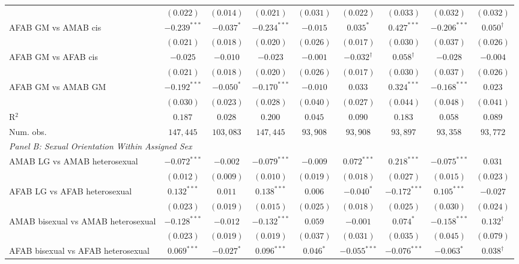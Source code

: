 \begin{table}[htpb!]
{\begin{tabular}{l c c c c c c c c}
 & $(0.022)$ & $(0.014)$ & $(0.021)$ & $(0.031)$ & $(0.022)$ & $(0.033)$ & $(0.032)$ & $(0.032)$ \\
AFAB GM vs AMAB cis & $-0.239^{***}$ & $-0.037^{*}$ & $-0.234^{***}$ & $-0.015$ & $0.035^{*}$ & $0.427^{***}$ & $-0.206^{***}$ & $0.050^{\dagger}$ \\
 & $(0.021)$ & $(0.018)$ & $(0.020)$ & $(0.026)$ & $(0.017)$ & $(0.030)$ & $(0.037)$ & $(0.026)$ \\
AFAB GM vs AFAB cis & $-0.025$ & $-0.010$ & $-0.023$ & $-0.001$ & $-0.032^{\dagger}$ & $0.058^{\dagger}$ & $-0.028$ & $-0.004$ \\
 & $(0.021)$ & $(0.018)$ & $(0.020)$ & $(0.026)$ & $(0.017)$ & $(0.030)$ & $(0.037)$ & $(0.026)$ \\
AFAB GM vs AMAB GM & $-0.192^{***}$ & $-0.050^{*}$ & $-0.170^{***}$ & $-0.010$ & $0.033$ & $0.324^{***}$ & $-0.168^{***}$ & $0.023$ \\
 & $(0.030)$ & $(0.023)$ & $(0.028)$ & $(0.040)$ & $(0.027)$ & $(0.044)$ & $(0.048)$ & $(0.041)$ \\
\hline
R$^2$ & $0.187$ & $0.028$ & $0.200$ & $0.045$ & $0.090$ & $0.183$ & $0.058$ & $0.089$ \\
Num. obs. & $147,445$ & $103,083$ & $147,445$ & $93,908$ & $93,908$ & $93,897$ & $93,358$ & $93,772$ \\
\hline
\multicolumn{9}{l}{\textit{Panel B: Sexual Orientation Within Assigned Sex}} \\
AMAB LG vs AMAB heterosexual & $-0.072^{***}$ & $-0.002$ & $-0.079^{***}$ & $-0.009$ & $0.072^{***}$ & $0.218^{***}$ & $-0.075^{***}$ & $0.031$ \\
 & $(0.012)$ & $(0.009)$ & $(0.010)$ & $(0.019)$ & $(0.018)$ & $(0.027)$ & $(0.015)$ & $(0.023)$ \\
AFAB LG vs AFAB heterosexual & $0.132^{***}$ & $0.011$ & $0.138^{***}$ & $0.006$ & $-0.040^{*}$ & $-0.172^{***}$ & $0.105^{***}$ & $-0.027$ \\
 & $(0.023)$ & $(0.019)$ & $(0.015)$ & $(0.025)$ & $(0.018)$ & $(0.025)$ & $(0.030)$ & $(0.024)$ \\
AMAB bisexual vs AMAB heterosexual & $-0.128^{***}$ & $-0.012$ & $-0.132^{***}$ & $0.059$ & $-0.001$ & $0.074^{*}$ & $-0.158^{***}$ & $0.132^{\dagger}$ \\
 & $(0.023)$ & $(0.019)$ & $(0.019)$ & $(0.037)$ & $(0.031)$ & $(0.035)$ & $(0.045)$ & $(0.079)$ \\
AFAB bisexual vs AFAB heterosexual & $0.069^{***}$ & $-0.027^{*}$ & $0.096^{***}$ & $0.046^{*}$ & $-0.055^{***}$ & $-0.076^{***}$ & $-0.063^{*}$ & $0.038^{\dagger}$ \\

\end{tabular}}
\end{table}
